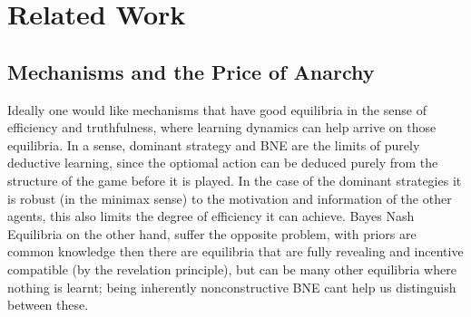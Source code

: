 





\section{Related Work}


\subsection{Mechanisms and the Price of Anarchy}

Ideally one would like mechanisms that have good equilibria in the sense of efficiency and truthfulness, where learning dynamics can help arrive on those equilibria. 
In a sense, dominant strategy and BNE are the limits of purely deductive learning, since the optiomal action can be deduced purely from the structure of the game before it is played. 
In the case of the dominant strategies it is robust (in the minimax sense) to the motivation and information of the other agents, this also limits the degree of efficiency it can achieve. 
Bayes Nash Equilibria on the other hand, suffer the opposite problem, with priors are common knowledge then there are equilibria that are fully revealing and incentive compatible (by the revelation principle), but can be many other equilibria where nothing is learnt; being inherently nonconstructive BNE cant help us distinguish between these. 


